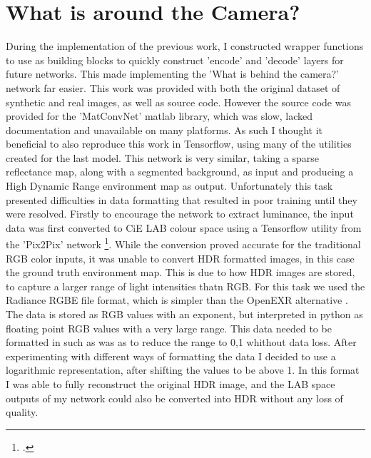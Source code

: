 \documentclass[ %
                    author={Gavin Parker},
                supervisor={Dr. Neill Campbell},
                    degree={MEng},
                     title={Deep Siamese Networks for Illumination Estimation from Stereo Images},
                  subtitle={},
                      type={research},
                      year={2018} ]{dissertation}
\begin{document}
\section{What is around the Camera?}
During the implementation of the previous work, I constructed wrapper functions to use as building blocks to quickly construct 'encode' and 'decode' layers for future networks. This made implementing the 'What is behind the camera?' network far easier. This work was provided with both the original dataset of synthetic and real images, as well as source code. However the source code was provided for the 'MatConvNet' matlab library, which was slow, lacked documentation and unavailable on many platforms. As such I thought it beneficial to also reproduce this work in Tensorflow, using many of the utilities created for the last model. This network is very similar, taking a sparse reflectance map, along with a segmented background, as input and producing a High Dynamic Range environment map as output.
\newline
Unfortunately this task presented difficulties in data formatting that resulted in poor training until they were resolved. Firstly to encourage the network to extract luminance, the input data was first converted to CiE LAB colour space using a Tensorflow utility from the 'Pix2Pix' network \footcite{https://github.com/affinelayer/pix2pix-tensorflow/blob/master/pix2pix.py}. While the conversion proved accurate for the traditional RGB color inputs, it was unable to convert HDR formatted images, in this case the ground truth environment map. This is due to how HDR images are stored, to capture a larger range of light intensities thatn RGB. For this task we used the Radiance RGBE file format, which is simpler than the OpenEXR alternative . The data is stored as RGB values with an exponent, but interpreted in python as floating point RGB values with a very large range. This data needed to be formatted in such as was as to reduce the range to 0,1 whithout data loss. After experimenting with different ways of formatting the data I decided to use a logarithmic representation, after shifting the values to be above 1. In this format I was able to fully reconstruct the original HDR image, and the LAB space outputs of my network could also be converted into HDR without any loss of quality.
\newline
\end{document}
